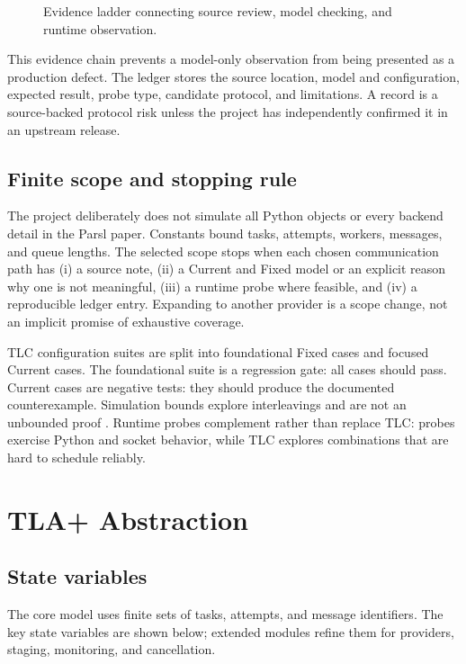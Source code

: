 \documentclass[11pt,a4paper]{article}
\begin{document}
\begin{figure}[h]
\centering
{}
\caption{Evidence ladder connecting source review, model checking, and runtime observation.}
\label{fig:evidence}
\end{figure}

This evidence chain prevents a model-only observation from being presented as a production defect.
The ledger stores the source location, model and configuration, expected result, probe type,
candidate protocol, and limitations. A record is a source-backed protocol risk unless the project
has independently confirmed it in an upstream release.

\subsection{Finite scope and stopping rule}
The project deliberately does not simulate all Python objects or every backend detail in the Parsl
paper. Constants bound tasks, attempts, workers, messages, and queue lengths. The selected scope
stops when each chosen communication path has (i) a source note, (ii) a Current and Fixed model or
an explicit reason why one is not meaningful, (iii) a runtime probe where feasible, and (iv) a
reproducible ledger entry. Expanding to another provider is a scope change, not an implicit promise
of exhaustive coverage.

TLC configuration suites are split into foundational Fixed cases and focused Current cases. The
foundational suite is a regression gate: all cases should pass. Current cases are negative tests:
they should produce the documented counterexample. Simulation bounds explore interleavings and are
not an unbounded proof \cite{yu1999modelchecking,konnov2019symbolic}. Runtime probes complement rather than replace TLC: probes exercise Python
and socket behavior, while TLC explores combinations that are hard to schedule reliably.

\section{TLA+ Abstraction}
\subsection{State variables}
The core model uses finite sets of tasks, attempts, and message identifiers. The key state variables
are shown below; extended modules refine them for providers, staging, monitoring, and cancellation.
\end{document}
